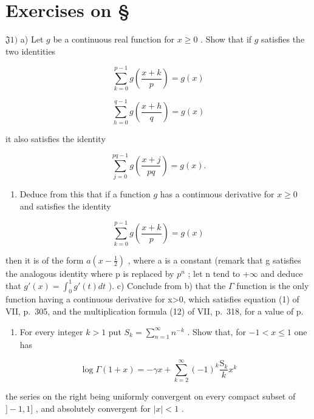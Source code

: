 \section*{Exercises on \S{}}
{}

\(\mathfrak{J}1)\) a) Let \(g\) be a continuous real function for \(x \geqslant 0\) . Show that if \(g\) satisfies the two identities

\[
\sum_ {k = 0} ^ {p - 1} g \left(\frac {x + k}{p}\right) = g (x)
\]

\[
\sum_ {h = 0} ^ {q - 1} g \left(\frac {x + h}{q}\right) = g (x)
\]

it also satisfies the identity

\[
\sum_ {j = 0} ^ {p q - 1} g \left(\frac {x + j}{p q}\right) = g (x).
\]

\begin{enumerate}
\def\labelenumi{\alph{enumi})}
\setcounter{enumi}{1}
\tightlist
\item
  Deduce from this that if a function \(g\) has a continuous derivative for \(x \geqslant 0\) and satisfies the identity
\end{enumerate}

\[
\sum_ {k = 0} ^ {p - 1} g \left(\frac {x + k}{p}\right) = g (x)
\]

then it is of the form \(a(x-\frac{1}{2})\) , where a is a constant (remark that g satisfies the analogous identity where p is replaced by \(p^{n}\) ; let n tend to \(+\infty\) and deduce that \(g'(x)=\int_{0}^{1}g'(t)dt\) ). c) Conclude from b) that the \(\Gamma\) function is the only function having a continuous derivative for x\textgreater0, which satisfies equation (1) of VII, p.~305, and the multiplication formula (12) of VII, p.~318, for a value of p.

\begin{enumerate}
\def\labelenumi{\arabic{enumi})}
\setcounter{enumi}{1}
\tightlist
\item
  For every integer \(k > 1\) put \(S_k = \sum_{n=1}^{\infty} n^{-k}\) . Show that, for \(-1 < x \leqslant 1\) one has
\end{enumerate}

\[
\log \Gamma (1 + x) = - \gamma x + \sum_ {k = 2} ^ {\infty} (- 1) ^ {k} \frac {\mathrm{S} _ {k}}{k} x ^ {k}
\]

the series on the right being uniformly convergent on every compact subset of \(]-1,1]\) , and absolutely convergent for \(|x|<1\) .


